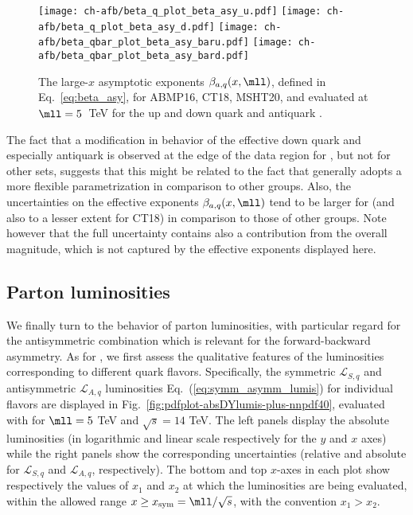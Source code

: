 \begin{figure}[!t]
 \centering
 \texttt{[image: ch-afb/beta\_q\_plot\_beta\_asy\_u.pdf]}
 \texttt{[image: ch-afb/beta\_q\_plot\_beta\_asy\_d.pdf]}
 \texttt{[image: ch-afb/beta\_qbar\_plot\_beta\_asy\_baru.pdf]}
 \texttt{[image: ch-afb/beta\_qbar\_plot\_beta\_asy\_bard.pdf]}
 \caption{\small The large-$x$ asymptotic exponents $\beta_{a,q}(x,\mll)$, defined
   in Eq.~\eqref{eq:beta_asy},
   for ABMP16, CT18, MSHT20, and  evaluated at $\mll=5$~TeV
   for the up and down quark and antiquark \pdfs.}    
 \label{fig:asy_exponents}
\end{figure}

The fact that a modification in behavior of the effective down quark
and especially antiquark \pdfs is observed at the edge of the data
region for , but not for other \pdf sets, suggests that this
might be related to the fact that   generally adopts a more
flexible \pdf parametrization in comparison to other groups.
%
Also, the  uncertainties on the effective exponents
$\beta_{a,q}(x,\mll)$ tend to be larger for  (and also to a
lesser extent for CT18) in comparison to those of other groups.
Note however that the full \pdf uncertainty contains also a
contribution from the overall 
magnitude, which is not captured by the effective exponents displayed here.

\subsection{Parton luminosities}
\label{subsec:partoniclumis}

We finally turn to the behavior of parton luminosities, with
particular regard for the antisymmetric combination which is relevant
for the forward-backward asymmetry.
As for \pdfs, we first assess the qualitative features of the
luminosities corresponding to different quark flavors.
Specifically, the symmetric $\mathcal{L}_{S,q}$ and antisymmetric
$\mathcal{L}_{A,q}$ luminosities
Eq.~(\ref{eq:symm_asymm_lumis})  for individual flavors are
displayed in Fig.~\ref{fig:pdfplot-absDYlumis-plus-nnpdf40},
evaluated with  \nnlo for $\mll=5$ TeV and $\sqrt{s}=14$ TeV.
%
The left panels display the absolute luminosities (in logarithmic and
linear scale respectively
for the $y$ and $x$ axes)
while the right panels show the corresponding \pdf uncertainties (relative and absolute for
$\mathcal{L}_{S,q}$ and $\mathcal{L}_{A,q}$, respectively).
%
The bottom  and top $x$-axes in each plot show respectively the values
of $x_1$ and $x_2$  at which the
luminosities are being evaluated, within the allowed range
$x \ge x_{\rm sym}=\mll/\sqrt{s}$, with the convention $x_1>x_2$.

